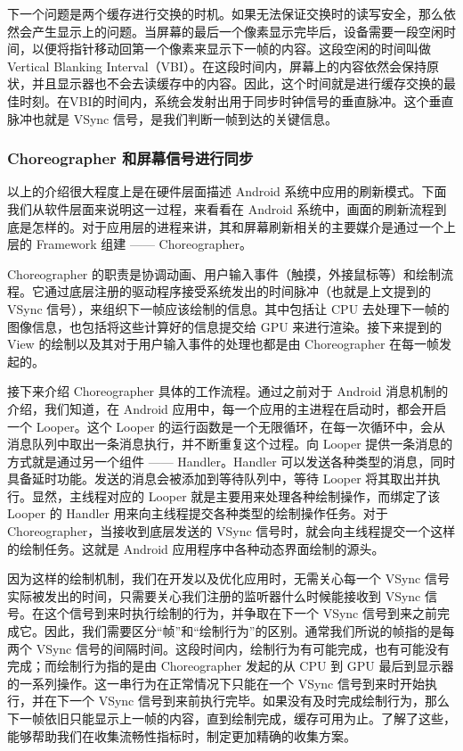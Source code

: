 下一个问题是两个缓存进行交换的时机。如果无法保证交换时的读写安全，那么依然会产生显示上的问题。当屏幕的最后一个像素显示完毕后，设备需要一段空闲时间，以便将指针移动回第一个像素来显示下一帧的内容。这段空闲的时间叫做 Vertical Blanking Interval（VBI）\cite{anderson1971vertical}。在这段时间内，屏幕上的内容依然会保持原状，并且显示器也不会去读缓存中的内容。因此，这个时间就是进行缓存交换的最佳时刻。在VBI的时间内，系统会发射出用于同步时钟信号的垂直脉冲。这个垂直脉冲也就是 VSync 信号，是我们判断一帧到达的关键信息。

\subsubsection{Choreographer 和屏幕信号进行同步}

以上的介绍很大程度上是在硬件层面描述 Android 系统中应用的刷新模式。下面我们从软件层面来说明这一过程，来看看在 Android 系统中，画面的刷新流程到底是怎样的。对于应用层的进程来讲，其和屏幕刷新相关的主要媒介是通过一个上层的 Framework 组建 —— Choreographer。

Choreographer 的职责是协调动画、用户输入事件（触摸，外接鼠标等）和绘制流程。它通过底层注册的驱动程序接受系统发出的时间脉冲（也就是上文提到的 VSync 信号），来组织下一帧应该绘制的信息。其中包括让 CPU 去处理下一帧的图像信息，也包括将这些计算好的信息提交给 GPU 来进行渲染。接下来提到的 View 的绘制以及其对于用户输入事件的处理也都是由 Choreographer 在每一帧发起的。

接下来介绍 Choreographer 具体的工作流程。通过之前对于 Android 消息机制的介绍，我们知道，在 Android 应用中，每一个应用的主进程在启动时，都会开启一个 Looper。这个 Looper 的运行函数是一个无限循环，在每一次循环中，会从消息队列中取出一条消息执行，并不断重复这个过程。向 Looper 提供一条消息的方式就是通过另一个组件 —— Handler。Handler 可以发送各种类型的消息，同时具备延时功能。发送的消息会被添加到等待队列中，等待 Looper 将其取出并执行。显然，主线程对应的 Looper 就是主要用来处理各种绘制操作，而绑定了该 Looper 的 Handler 用来向主线程提交各种类型的绘制操作任务。对于 Choreographer，当接收到底层发送的 VSync 信号时，就会向主线程提交一个这样的绘制任务。这就是 Android 应用程序中各种动态界面绘制的源头。

因为这样的绘制机制，我们在开发以及优化应用时，无需关心每一个 VSync 信号实际被发出的时间，只需要关心我们注册的监听器什么时候能接收到 VSync 信号。在这个信号到来时执行绘制的行为，并争取在下一个 VSync 信号到来之前完成它。因此，我们需要区分“帧”和“绘制行为”的区别。通常我们所说的帧指的是每两个 VSync 信号的间隔时间。这段时间内，绘制行为有可能完成，也有可能没有完成；而绘制行为指的是由 Choreographer 发起的从 CPU 到 GPU 最后到显示器的一系列操作。这一串行为在正常情况下只能在一个 VSync 信号到来时开始执行，并在下一个 VSync 信号到来前执行完毕。如果没有及时完成绘制行为，那么下一帧依旧只能显示上一帧的内容，直到绘制完成，缓存可用为止。了解了这些，能够帮助我们在收集流畅性指标时，制定更加精确的收集方案。

